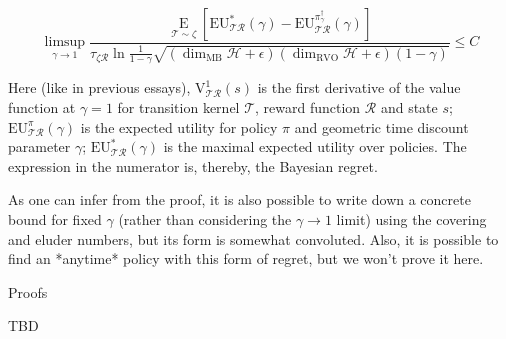 \documentclass[a4paper]{article}
\newcommand{\AP}[1]{\left(#1\right)}
\newcommand{\AB}[1]{\left[#1\right]}
\newcommand{\Ea}[2]{\underset{#1}{\operatorname{E}}\AB{#2}}
\newcommand{\R}{\mathcal{R}}
\newcommand{\T}{\mathcal{T}}
\newcommand{\Hy}{\mathcal{H}}
\newcommand{\RVO}{\dim_{\text{RVO}}}
\newcommand{\MB}{\dim_{\text{MB}}}
\newcommand{\V}{\mathrm{V}}
\newcommand{\EU}{\mathrm{EU}}
\begin{document}
$$\limsup_{\gamma \rightarrow 1}\frac{\Ea{\T\sim\zeta}{\EU^*_{\T\R}(\gamma)-\EU^{\pi^\dagger_\gamma}_{\T\R}(\gamma)}}{\tau_{\zeta\R}\ln{\frac{1}{1-\gamma}}\sqrt{\AP{\MB\Hy+\epsilon}\AP{\RVO\Hy+\epsilon}(1-\gamma)}}\leq C$$

Here (like in previous essays), $\V^1_{\T\R}(s)$ is the first derivative of the value function at $\gamma=1$ for transition kernel $\T$, reward function $\R$ and state $s$; $\EU^{\pi}_{\T\R}(\gamma)$ is the expected utility for policy $\pi$ and geometric time discount parameter $\gamma$; $\EU^*_{\T\R}(\gamma)$ is the maximal expected utility over policies. The expression in the numerator is, thereby, the Bayesian regret.

As one can infer from the proof, it is also possible to write down a concrete bound for fixed $\gamma$ (rather than considering the $\gamma\rightarrow 1$ limit) using the covering and eluder numbers, but its form is somewhat convoluted. Also, it is possible to find an *anytime* policy with this form of regret, but we won't prove it here.

\begin{Huge}Proofs\end{Huge}

TBD
\end{document}
